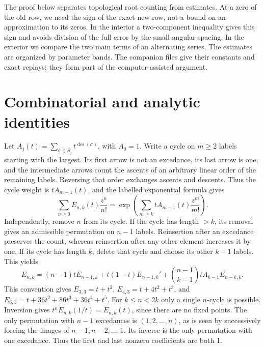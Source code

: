\documentclass[11pt,reqno]{amsart}
\theoremstyle{remark}
\begin{document}
The proof below separates topological root counting from estimates. At a zero of the old row, we need the sign of the exact new row, not a bound on an approximation to its zeros. In the interior a two-component inequality gives this sign and avoids division of the full error by the small angular spacing. In the exterior we compare the two main terms of an alternating series. The estimates are organized by parameter bands. The companion files give their constants and exact replays; they form part of the computer-assisted argument.

\section{Combinatorial and analytic identities}\label{sec:identity}
Let $A_j(t)=\sum_{\sigma\in S_j}t^{\operatorname{des}(\sigma)}$, with $A_0=1$. Write a cycle on $m\ge2$ labels starting with the largest. Its first arrow is not an excedance, its last arrow is one, and the intermediate arrows count the ascents of an arbitrary linear order of the remaining labels. Reversing that order exchanges ascents and descents. Thus the cycle weight is $tA_{m-1}(t)$, and the labelled exponential formula gives
\begin{equation}\label{eq:egf}
 \sum_{n\ge0}E_{n,k}(t)\frac{z^n}{n!}
   =\exp\left(\sum_{m\ge k}tA_{m-1}(t)\frac{z^m}{m!}\right).
\end{equation}
Independently, remove $n$ from its cycle. If the cycle has length $>k$, its removal gives an admissible permutation on $n-1$ labels. Reinsertion after an excedance preserves the count, whereas reinsertion after any other element increases it by one. If its cycle has length $k$, delete that cycle and choose its other $k-1$ labels. This yields
\begin{equation}\label{eq:rec}
 E_{n,k}=(n-1)tE_{n-1,k}+t(1-t)E_{n-1,k}'
       +\binom{n-1}{k-1}tA_{k-1}E_{n-k,k}.
\end{equation}
This convention gives $E_{3,3}=t+t^2$, $E_{4,3}=t+4t^2+t^3$, and
$E_{6,3}=t+36t^2+86t^3+36t^4+t^5$. For $k\le n<2k$ only a single $n$-cycle is possible. Inversion gives $t^nE_{n,k}(1/t)=E_{n,k}(t)$, since there are no fixed points. The only permutation with $n-1$ excedances is $(1,2,\dots,n)$, as is seen by successively forcing the images of $n-1,n-2,\ldots,1$. Its inverse is the only permutation with one excedance. Thus the first and last nonzero coefficients are both 1.
\end{document}
